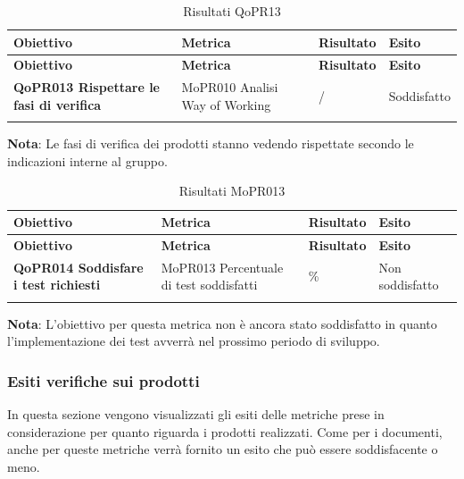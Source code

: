\documentclass[../piano-di-qualifica.tex]{subfiles}
\begin{document}
\renewcommand{\arraystretch}{2} %
\begin{longtable}[H]{>{\centering\bfseries}m{5cm} >{\centering}m{5cm} >{\centering}m{2.5cm} >{\centering\arraybackslash}m{2.5cm}}  
  \rowcolor{lightgray}
  {\textbf{Obiettivo}} & {\textbf{Metrica}} & {\textbf{Risultato}} & {\textbf{Esito}}  \\
  \endfirsthead%
  \rowcolor{lightgray}
  {\textbf{Obiettivo}} & {\textbf{Metrica}} & {\textbf{Risultato}} & {\textbf{Esito}}  \\
  \endhead%
  \textbf{QoPR013 Rispettare le fasi di verifica} & MoPR010 Analisi Way of Working & / & Soddisfatto \\
  \caption{Risultati QoPR13}
  \label{tab:my-table}
\end{longtable}
\textbf{Nota}: Le fasi di verifica dei prodotti stanno vedendo rispettate secondo le indicazioni interne al gruppo.

\renewcommand{\arraystretch}{2} %
\begin{longtable}[H]{>{\centering\bfseries}m{5cm} >{\centering}m{5cm} >{\centering}m{2.5cm} >{\centering\arraybackslash}m{2.5cm}}  
  \rowcolor{lightgray}
  {\textbf{Obiettivo}} & {\textbf{Metrica}} & {\textbf{Risultato}} & {\textbf{Esito}}  \\
  \endfirsthead%
  \rowcolor{lightgray}
  {\textbf{Obiettivo}} & {\textbf{Metrica}} & {\textbf{Risultato}} & {\textbf{Esito}}  \\
  \endhead%
  \textbf{QoPR014 Soddisfare i test richiesti} & MoPR013 Percentuale di test soddisfatti & 0\% & Non soddisfatto \\
  \caption{Risultati MoPR013}
  \label{tab:my-table}
\end{longtable}
\textbf{Nota}: L'obiettivo per questa metrica non è ancora stato soddisfatto in quanto l'implementazione dei test avverrà nel prossimo periodo di sviluppo.

\subsubsection{Esiti verifiche sui prodotti}
\label{sub:esiti_verifiche_sui_prodotti}
In questa sezione vengono visualizzati gli esiti delle metriche prese in considerazione per quanto riguarda i prodotti realizzati. Come per i documenti, anche per queste metriche verrà fornito un esito che può essere soddisfacente o meno.
\end{document}
